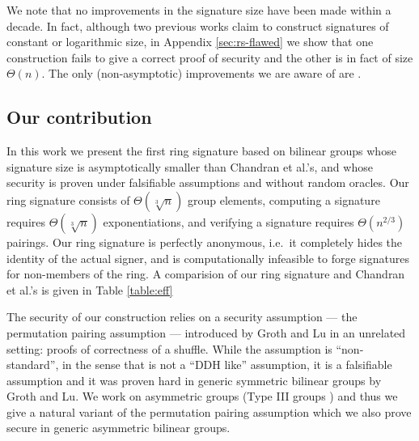 We note that no improvements in the
signature size have been made within a decade. In fact, although two previous works claim to construct signatures of constant \cite{ACISP:BosDasRan15} or logarithmic \cite{IET:GriSusPla16} size, in Appendix \ref{sec:rs-flawed} we show that one construction fails to give a correct proof of security and the other is in fact of size $\Theta(n)$. The only (non-asymptotic) improvements we are aware of are \cite{TCC:Rafols15,AC:GonHevRaf15}.

\subsection{Our contribution}
In this work we present the first ring signature based on bilinear groups whose signature size is asymptotically smaller than Chandran et al.'s, and whose security is proven under falsifiable assumptions and without random oracles. Our ring signature consists of $\Theta(\sqrt[3]{n})$ group elements, computing a signature requires $\Theta(\sqrt[3]{n})$ exponentiations, and verifying a signature requires $\Theta(n^{2/3})$ pairings. Our ring signature is perfectly anonymous, i.e.~it completely hides the identity of the actual signer, and is computationally infeasible to forge signatures for non-members of the ring. A comparision of our ring signature and Chandran et al.'s is given in Table \ref{table:eff}

The security of our construction relies on a security assumption --- the {permutation pairing assumption} --- introduced by Groth and Lu \cite{AC:GroLu07} in an unrelated setting: proofs of correctness of a shuffle. While the assumption is ``non-standard'', in the sense that is not a ``DDH like'' assumption, it is a falsifiable assumption and it was proven hard in generic symmetric bilinear groups by Groth and Lu. We work on asymmetric groups (Type III groups \cite{EPRINT:GalPatSma06}) and thus we give a natural variant of the permutation pairing assumption which we also prove secure in generic asymmetric bilinear groups.

 
